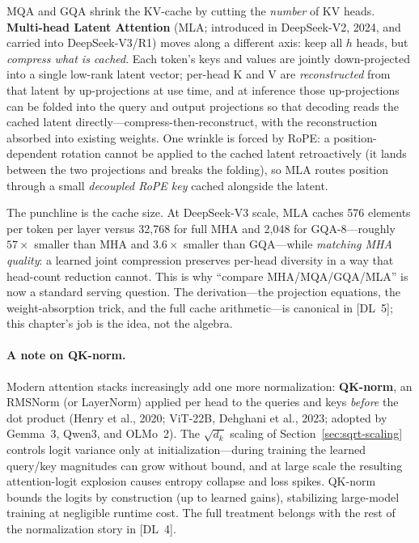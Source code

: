MQA and GQA shrink the KV-cache by cutting the \emph{number} of KV heads.
\textbf{Multi-head Latent Attention} (MLA; introduced in DeepSeek-V2,
2024, and carried into DeepSeek-V3/R1) moves along a different axis: keep
all $h$ heads, but \emph{compress what is cached}.  Each token's keys and
values are jointly down-projected into a single low-rank latent vector;
per-head K and V are \emph{reconstructed} from that latent by
up-projections at use time, and at inference those up-projections can be
folded into the query and output projections so that decoding reads the
cached latent directly---compress-then-reconstruct, with the
reconstruction absorbed into existing weights.  One wrinkle is forced by
RoPE: a position-dependent rotation cannot be applied to the cached latent
retroactively (it lands between the two projections and breaks the
folding), so MLA routes position through a small \emph{decoupled RoPE key}
cached alongside the latent.

The punchline is the cache size.  At DeepSeek-V3 scale, MLA caches 576
elements per token per layer versus 32{,}768 for full MHA and 2{,}048 for
GQA-8---roughly $57\times$ smaller than MHA and $3.6\times$ smaller than
GQA---while \emph{matching MHA quality}: a learned joint compression
preserves per-head diversity in a way that head-count reduction cannot.
This is why ``compare MHA/MQA/GQA/MLA'' is now a standard serving
question.  The derivation---the projection equations, the
weight-absorption trick, and the full cache arithmetic---is canonical in
[DL~5]; this chapter's job is the idea, not the algebra.

\paragraph{A note on QK-norm.}
Modern attention stacks increasingly add one more normalization:
\textbf{QK-norm}, an RMSNorm (or LayerNorm) applied per head to the
queries and keys \emph{before} the dot product (Henry et al., 2020;
ViT-22B, Dehghani et al., 2023; adopted by Gemma~3, Qwen3, and OLMo~2).
The $\sqrt{d_k}$ scaling of Section~\ref{sec:sqrt-scaling} controls logit
variance only at initialization---during training the learned query/key
magnitudes can grow without bound, and at large scale the resulting
attention-logit explosion causes entropy collapse and loss spikes.
QK-norm bounds the logits by construction (up to learned gains),
stabilizing large-model training at negligible runtime cost.  The full
treatment belongs with the rest of the normalization story in [DL~4].

